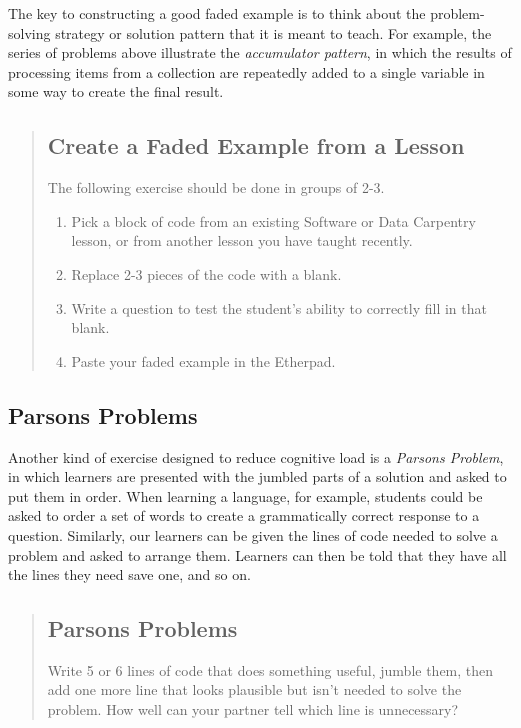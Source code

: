 The key to constructing a good faded example is to think about the problem-solving strategy
or solution pattern that it is meant to teach.
For example,
the series of problems above illustrate the \emph{accumulator pattern},
in which the results of processing items from a collection
are repeatedly added to a single variable in some way
to create the final result.

\begin{quotation}   %
\subsection*{Create a Faded Example from a Lesson}

The following exercise should be done in groups of 2-3.

\begin{enumerate}
\item Pick a block of code from an existing Software or Data Carpentry lesson,
or from another lesson you have taught recently.
\item Replace 2-3 pieces of the code with a blank.
\item Write a question to test the student's ability to correctly fill in that blank.
\item Paste your faded example in the Etherpad.
\end{enumerate}
\end{quotation}   %

\subsection*{Parsons Problems}

Another kind of exercise designed to reduce cognitive load is a \emph{Parsons Problem},
in which learners are presented with the jumbled parts of a solution
and asked to put them in order.
When learning a language,
for example,
students could be asked to order a set of words
to create a grammatically correct response to a question.
Similarly,
our learners can be given the lines of code needed to solve a problem
and asked to arrange them.
Learners can then be told that they have all the lines they need save one,
and so on.

\begin{quotation}   %
\subsection*{Parsons Problems}

Write 5 or 6 lines of code that does something useful,
jumble them,
then add one more line that looks plausible but isn't needed to solve the problem.
How well can your partner tell which line is unnecessary?
\end{quotation}   %

